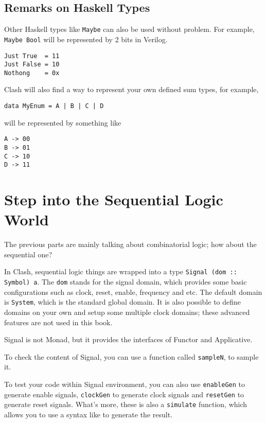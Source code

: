 \subsection{Remarks on Haskell Types}
Other Haskell types like \texttt{Maybe} can also be used without problem. For example, \texttt{Maybe Bool} will be represented by 2 bits in Verilog.
\begin{verbatim}
Just True  = 11
Just False = 10
Nothong    = 0x
\end{verbatim}
Clash will also find a way to represent your own defined sum types, for example,
\begin{verbatim}
data MyEnum = A | B | C | D
\end{verbatim}
will be represented by something like
\begin{verbatim}
A -> 00
B -> 01
C -> 10
D -> 11
\end{verbatim}

\section{Step into the Sequential Logic World} 
The previous parts are mainly talking about combinatorial logic; how about the sequential one? 

In Clash, sequential logic things are wrapped into a type \texttt{Signal (dom :: Symbol) a}.
The \texttt{dom} stands for the signal domain, which provides some basic configurations such as
clock, reset, enable, frequency and etc. The default domain is \texttt{System}, which is the standard global domain. It is also possible to define domains on your own and setup some multiple clock domains; these advanced features are not used in this book.

Signal is not Monad, but it provides the interfaces of Functor and Applicative.

To check the content of Signal, you can use a function called \texttt{sampleN}, to sample it.

To test your code within Signal environment, you can also use \texttt{enableGen} to generate enable signals, 
\texttt{clockGen} to generate clock signals and \texttt{resetGen} to generate reset signals. What's more, these is also a \texttt{simulate} function, which allows you to use a syntax like  to generate the result.

